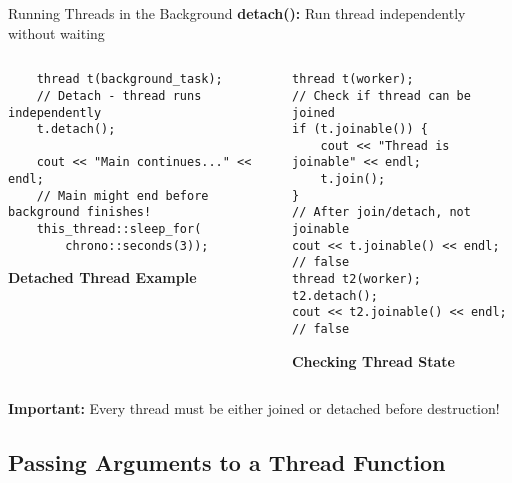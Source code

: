 \begin{frame}[fragile]{Running Threads in the Background}
	\textbf{detach():} Run thread independently without waiting

	\begin{columns}
		\begin{column}{0.5\textwidth}
			\begin{verbatim}
    thread t(background_task);
    // Detach - thread runs independently
    t.detach();

    cout << "Main continues..." << endl;
    // Main might end before background finishes!
    this_thread::sleep_for(
        chrono::seconds(3));
			\end{verbatim}
			\textbf{Detached Thread Example}
		\end{column}
		\begin{column}{0.5\textwidth}
			\begin{verbatim}
thread t(worker);
// Check if thread can be joined
if (t.joinable()) {
    cout << "Thread is joinable" << endl;
    t.join();
}
// After join/detach, not joinable
cout << t.joinable() << endl;  // false
thread t2(worker);
t2.detach();
cout << t2.joinable() << endl;  // false
			\end{verbatim}
			\textbf{Checking Thread State}
		\end{column}
	\end{columns}

	\textbf{Important:} Every thread must be either joined or detached before destruction!
\end{frame}

\subsection{Passing Arguments to a Thread Function}

